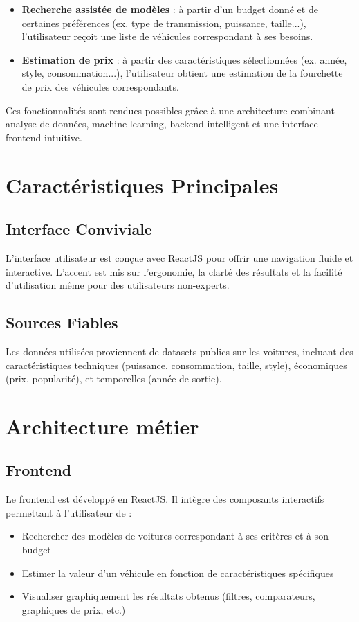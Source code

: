 \documentclass[12pt]{report}
\begin{document}
\begin{itemize}
    \item \textbf{Recherche assistée de modèles} : à partir d’un budget donné et de certaines préférences (ex. type de transmission, puissance, taille...), l’utilisateur reçoit une liste de véhicules correspondant à ses besoins.
    \item \textbf{Estimation de prix} : à partir des caractéristiques sélectionnées (ex. année, style, consommation...), l’utilisateur obtient une estimation de la fourchette de prix des véhicules correspondants.
\end{itemize}

Ces fonctionnalités sont rendues possibles grâce à une architecture combinant analyse de données, machine learning, backend intelligent et une interface frontend intuitive.


\chapter{Caractéristiques Principales}
\section{Interface Conviviale}
L’interface utilisateur est conçue avec ReactJS pour offrir une navigation fluide et interactive.
L’accent est mis sur l’ergonomie, la clarté des résultats et la facilité d’utilisation même pour des utilisateurs non-experts.


\section{Sources Fiables}
Les données utilisées proviennent de datasets publics sur les voitures, incluant des caractéristiques techniques (puissance, consommation, taille, style), économiques (prix, popularité), et temporelles (année de sortie).

\chapter{Architecture métier}
\section{Frontend}
Le frontend est développé en ReactJS. Il intègre des composants interactifs permettant à l’utilisateur de :

\begin{itemize}
    \item Rechercher des modèles de voitures correspondant à ses critères et à son budget
    \item Estimer la valeur d’un véhicule en fonction de caractéristiques spécifiques
    \item Visualiser graphiquement les résultats obtenus (filtres, comparateurs, graphiques de prix, etc.)
\end{itemize}
\end{document}
